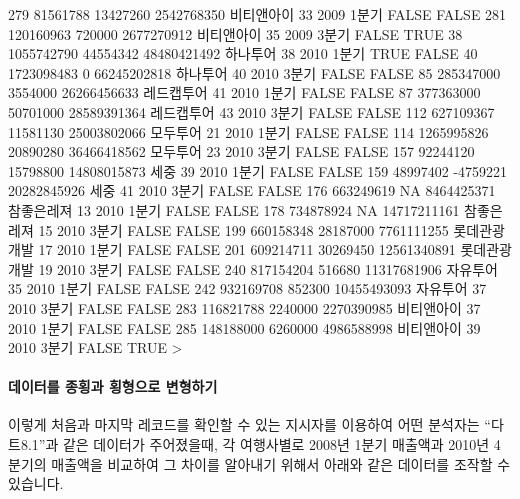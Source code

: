 \begin{Schunk}
\begin{Soutput}
279   81561788   13427260  2542768350   비티앤아이   33 2009 1분기 FALSE FALSE
281  120160963     720000  2677270912   비티앤아이   35 2009 3분기 FALSE  TRUE
38  1055742790   44554342 48480421492     하나투어   38 2010 1분기  TRUE FALSE
40  1723098483          0 66245202818     하나투어   40 2010 3분기 FALSE FALSE
85   285347000    3554000 26266456633   레드캡투어   41 2010 1분기 FALSE FALSE
87   377363000   50701000 28589391364   레드캡투어   43 2010 3분기 FALSE FALSE
112  627109367   11581130 25003802066     모두투어   21 2010 1분기 FALSE FALSE
114 1265995826   20890280 36466418562     모두투어   23 2010 3분기 FALSE FALSE
157   92244120   15798800 14808015873         세중   39 2010 1분기 FALSE FALSE
159   48997402   -4759221 20282845926         세중   41 2010 3분기 FALSE FALSE
176  663249619         NA  8464425371   참좋은레져   13 2010 1분기 FALSE FALSE
178  734878924         NA 14717211161   참좋은레져   15 2010 3분기 FALSE FALSE
199  660158348   28187000  7761111255 롯데관광개발   17 2010 1분기 FALSE FALSE
201  609214711   30269450 12561340891 롯데관광개발   19 2010 3분기 FALSE FALSE
240  817154204     516680 11317681906     자유투어   35 2010 1분기 FALSE FALSE
242  932169708     852300 10455493093     자유투어   37 2010 3분기 FALSE FALSE
283  116821788    2240000  2270390985   비티앤아이   37 2010 1분기 FALSE FALSE
285  148188000    6260000  4986588998   비티앤아이   39 2010 3분기 FALSE  TRUE
> 
\end{Soutput}
\end{Schunk}

\paragraph{데이터를 종횡과 횡형으로 변형하기}
이렇게 처음과 마지막 레코드를 확인할 수 있는 지시자를 이용하여 어떤 분석자는 ``다트8.1''과 같은 데이터가 주어졌을때, 각 여행사별로 2008년 1분기 매출액과 2010년 4분기의 매출액을 비교하여 그 차이를 알아내기 위해서 아래와 같은 데이터를 조작할 수 있습니다.

